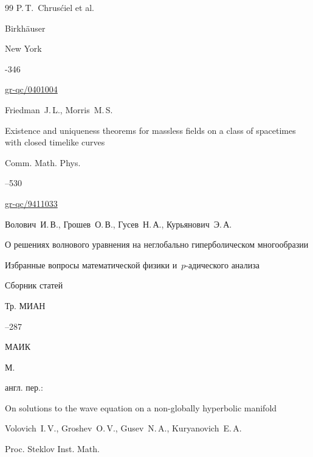 \begin{thebibliography}{99}
\ed P.\,T.~Chrus\'ciel et al.\nofrills

\publ Birkh\"auser

\publaddr New York


-346

\arxiv \href{http://arxiv.org/abs/gr-qc/0401004}{gr-qc/0401004} 










\by Friedman~J.\,L., Morris~M.\,S.

\paper Existence and uniqueness theorems for massless fields on a class of spacetimes with closed timelike curves

\jour Comm. Math. Phys.




--530

\arxiv \href{http://arxiv.org/abs/gr-qc/9411033}{gr-qc/9411033} 






\by Волович~И.\,В., Грошев~О.\,В., Гусев~Н.\,А., Курьянович~Э.\,А.

\paper О решениях волнового уравнения на неглобально гиперболическом многообразии

\inbook Избранные вопросы математической физики и~$p$-адического анализа

\bookinfo Сборник статей

\serial Тр. \mbox{МИАН}



--287

\publ МАИК

\publaddr М.

\transl англ. пер.:~

\paper On solutions to the wave equation on a non-globally hyperbolic manifold

\by Volovich~I.\,V.,  Groshev~O.\,V., Gusev~N.\,A.,  Kuryanovich~E.\,A.

\jour Proc. Steklov Inst. Math.




\end{thebibliography}
